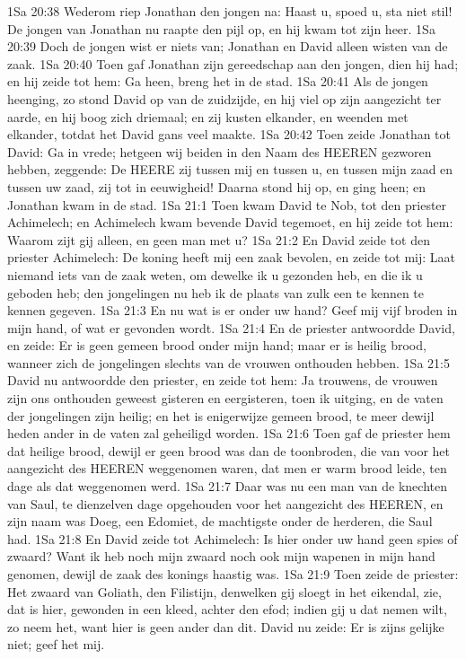 1Sa 20:38  Wederom riep Jonathan den jongen na: Haast u, spoed u, sta niet stil! De jongen van Jonathan nu raapte den pijl op, en hij kwam tot zijn heer.
1Sa 20:39  Doch de jongen wist er niets van; Jonathan en David alleen wisten van de zaak.
1Sa 20:40  Toen gaf Jonathan zijn gereedschap aan den jongen, dien hij had; en hij zeide tot hem: Ga heen, breng het in de stad.
1Sa 20:41  Als de jongen heenging, zo stond David op van de zuidzijde, en hij viel op zijn aangezicht ter aarde, en hij boog zich driemaal; en zij kusten elkander, en weenden met elkander, totdat het David gans veel maakte.
1Sa 20:42  Toen zeide Jonathan tot David: Ga in vrede; hetgeen wij beiden in den Naam des HEEREN gezworen hebben, zeggende: De HEERE zij tussen mij en tussen u, en tussen mijn zaad en tussen uw zaad, zij tot in eeuwigheid! Daarna stond hij op, en ging heen; en Jonathan kwam in de stad.
1Sa 21:1  Toen kwam David te Nob, tot den priester Achimelech; en Achimelech kwam bevende David tegemoet, en hij zeide tot hem: Waarom zijt gij alleen, en geen man met u?
1Sa 21:2  En David zeide tot den priester Achimelech: De koning heeft mij een zaak bevolen, en zeide tot mij: Laat niemand iets van de zaak weten, om dewelke ik u gezonden heb, en die ik u geboden heb; den jongelingen nu heb ik de plaats van zulk een te kennen te kennen gegeven.
1Sa 21:3  En nu wat is er onder uw hand? Geef mij vijf broden in mijn hand, of wat er gevonden wordt.
1Sa 21:4  En de priester antwoordde David, en zeide: Er is geen gemeen brood onder mijn hand; maar er is heilig brood, wanneer zich de jongelingen slechts van de vrouwen onthouden hebben.
1Sa 21:5  David nu antwoordde den priester, en zeide tot hem: Ja trouwens, de vrouwen zijn ons onthouden geweest gisteren en eergisteren, toen ik uitging, en de vaten der jongelingen zijn heilig; en het is enigerwijze gemeen brood, te meer dewijl heden ander in de vaten zal geheiligd worden.
1Sa 21:6  Toen gaf de priester hem dat heilige brood, dewijl er geen brood was dan de toonbroden, die van voor het aangezicht des HEEREN weggenomen waren, dat men er warm brood leide, ten dage als dat weggenomen werd.
1Sa 21:7  Daar was nu een man van de knechten van Saul, te dienzelven dage opgehouden voor het aangezicht des HEEREN, en zijn naam was Doeg, een Edomiet, de machtigste onder de herderen, die Saul had.
1Sa 21:8  En David zeide tot Achimelech: Is hier onder uw hand geen spies of zwaard? Want ik heb noch mijn zwaard noch ook mijn wapenen in mijn hand genomen, dewijl de zaak des konings haastig was.
1Sa 21:9  Toen zeide de priester: Het zwaard van Goliath, den Filistijn, denwelken gij sloegt in het eikendal, zie, dat is hier, gewonden in een kleed, achter den efod; indien gij u dat nemen wilt, zo neem het, want hier is geen ander dan dit. David nu zeide: Er is zijns gelijke niet; geef het mij.

